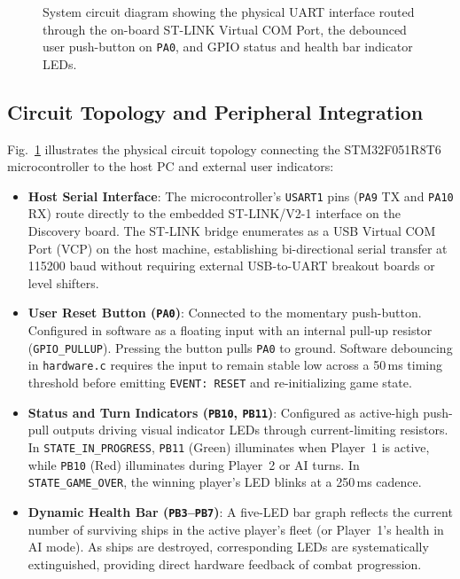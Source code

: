 \begin{figure}[t]
\caption{System circuit diagram showing the physical UART interface routed through the on-board ST-LINK Virtual COM Port, the debounced user push-button on \texttt{PA0}, and GPIO status and health bar indicator LEDs.}
\label{fig:circuit}
\end{figure}

\subsection{Circuit Topology and Peripheral Integration}
Fig.~\ref{fig:circuit} illustrates the physical circuit topology connecting the STM32F051R8T6 microcontroller to the host PC and external user indicators:
\begin{itemize}
    \item \textbf{Host Serial Interface}: The microcontroller's \texttt{USART1} pins (\texttt{PA9} TX and \texttt{PA10} RX) route directly to the embedded ST-LINK/V2-1 interface on the Discovery board. The ST-LINK bridge enumerates as a USB Virtual COM Port (VCP) on the host machine, establishing bi-directional serial transfer at 115200 baud without requiring external USB-to-UART breakout boards or level shifters.
    \item \textbf{User Reset Button (\texttt{PA0})}: Connected to the momentary push-button. Configured in software as a floating input with an internal pull-up resistor (\texttt{GPIO\_PULLUP}). Pressing the button pulls \texttt{PA0} to ground. Software debouncing in \texttt{hardware.c} requires the input to remain stable low across a 50\,ms timing threshold before emitting \texttt{EVENT: RESET} and re-initializing game state.
    \item \textbf{Status and Turn Indicators (\texttt{PB10}, \texttt{PB11})}: Configured as active-high push-pull outputs driving visual indicator LEDs through current-limiting resistors. In \texttt{STATE\_IN\_PROGRESS}, \texttt{PB11} (Green) illuminates when Player~1 is active, while \texttt{PB10} (Red) illuminates during Player~2 or AI turns. In \texttt{STATE\_GAME\_OVER}, the winning player's LED blinks at a 250\,ms cadence.
    \item \textbf{Dynamic Health Bar (\texttt{PB3}--\texttt{PB7})}: A five-LED bar graph reflects the current number of surviving ships in the active player's fleet (or Player~1's health in AI mode). As ships are destroyed, corresponding LEDs are systematically extinguished, providing direct hardware feedback of combat progression.
\end{itemize}
